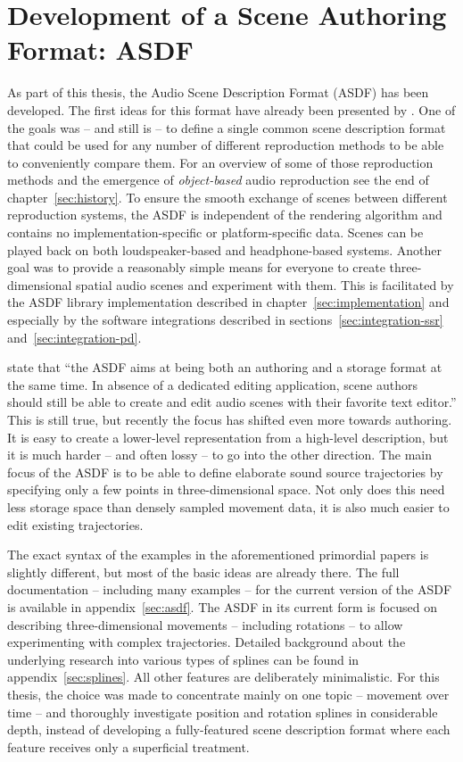 \chapter{Development of a Scene Authoring Format: ASDF}
\label{sec:format-development}

As part of this thesis,
the Audio Scene Description Format (ASDF) has been developed.
The first ideas for this format have already been presented by
\textcite{geier2008asdf-daga,geier2008asdf}.
One of the goals was -- and still is --
to define a single common scene description format
that could be used for any number of different reproduction methods
to be able to conveniently compare them.
For an overview of some of those reproduction methods
and the emergence of \emph{object-based} audio reproduction
see the end of chapter~\ref{sec:history}.
To ensure the smooth exchange of scenes between different reproduction systems,
the ASDF is independent of the rendering algorithm
and contains no implementation-specific or platform-specific data.
Scenes can be played back on both loudspeaker-based and headphone-based systems.
Another goal was to provide a reasonably simple means for everyone
to create three-dimensional spatial audio scenes and experiment with them.
This is facilitated by the ASDF library implementation described in
chapter~\ref{sec:implementation}
and especially by the software integrations described in
sections~\ref{sec:integration-ssr}
and~\ref{sec:integration-pd}.

\textcite{geier2010future} state that
``the ASDF aims at being both an authoring and a storage format at the
same time. In absence of a dedicated editing application, scene authors should
still be able to create and edit audio scenes with their favorite text editor.''
This is still true,
but recently the focus has shifted even more towards authoring.
It is easy to create a lower-level representation from a high-level description,
but it is much harder -- and often lossy -- to go into the other direction.
The main focus of the ASDF is to be able to define elaborate sound source trajectories
by specifying only a few points in three-dimensional space.
Not only does this need less storage space than densely sampled movement data,
it is also much easier to edit existing trajectories.

The exact syntax of the examples in the
aforementioned primordial
papers is slightly different,
but most of the basic ideas are already there.
The full documentation -- including many examples --
for the current version of the ASDF
is available in appendix~\ref{sec:asdf}.
The ASDF in its current form is focused on describing three-dimensional
movements -- including rotations --
to allow experimenting with complex trajectories.
Detailed background about the underlying research into various
types of splines can be found in appendix~\ref{sec:splines}.
All other features are deliberately minimalistic.
For this thesis,
the choice was made to concentrate mainly on one topic -- movement over time --
and thoroughly investigate position and rotation splines in considerable depth,
instead of developing a fully-featured scene description format
where each feature receives only a superficial treatment.

